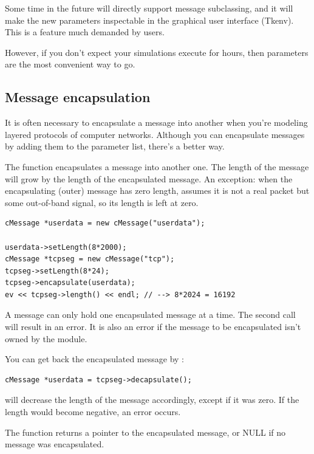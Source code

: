 Some time in the future {\opp} will directly support message 
subclassing, and it will make the new parameters inspectable 
in the graphical user interface (Tkenv). This is a feature much 
demanded by users.


However, if you don't expect your simulations execute for hours, 
then  parameters are the most convenient way to go.





\subsection{Message encapsulation}

It is often necessary to encapsulate a
message into another when you're modeling
layered protocols of computer networks. Although you can encapsulate
messages by adding them to the parameter list, there's a better way.


The  function encapsulates a message
into another one. The length of the message will grow by the length of
the encapsulated message. An exception: when the encapsulating (outer)
message has zero length, {\opp} assumes it is not a real packet but
some out-of-band signal, so its length is left at zero.

\begin{Verbatim}
cMessage *userdata = new cMessage("userdata");

userdata->setLength(8*2000);
cMessage *tcpseg = new cMessage("tcp");
tcpseg->setLength(8*24);
tcpseg->encapsulate(userdata);
ev << tcpseg->length() << endl; // --> 8*2024 = 16192
\end{Verbatim}


A message can only hold one encapsulated message at a time. The 
second  call will result in an error. It is also 
an error if the message to be encapsulated isn't owned by the 
module.

You can get back the encapsulated message by :

\begin{Verbatim}
cMessage *userdata = tcpseg->decapsulate();
\end{Verbatim}

 will decrease the length of the message accordingly, 
except if it was zero. If the length would become negative, an 
error occurs.


The  function returns a pointer to the encapsulated 
message, or NULL if no message was encapsulated.





